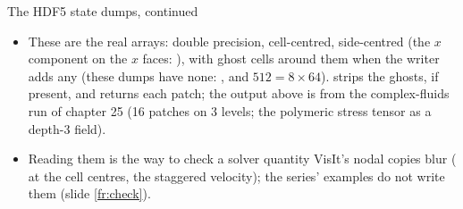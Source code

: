 \documentclass[aspectratio=169,11pt]{beamer}
\begin{document}
\begin{frame}{The HDF5 state dumps, continued}
\label{fr:hierh52}
\footnotesize
\begin{itemize}
  \item These are the real arrays: double precision,  cell-centred,  side-centred (the $x$ component on the $x$ faces: ), with  ghost cells around them when the writer adds any (these dumps have none: , and $512 = 8 \times 64$).  strips the ghosts, if present, and returns each patch; the output above is from the complex-fluids  run of chapter 25 (16 patches on 3 levels; the polymeric stress tensor as a depth-3 field).
  \item Reading them is the way to check a solver quantity VisIt's nodal copies blur ( at the cell centres, the staggered velocity); the series' examples do not write them (slide \ref{fr:check}).
\end{itemize}
\end{frame}
\end{document}
